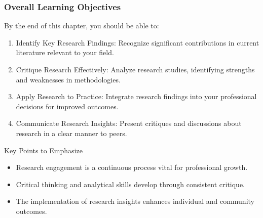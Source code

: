 \documentclass[aspectratio=169]{beamer}
\begin{document}
\begin{frame}[fragile]
    \frametitle{Overall Learning Objectives}
    By the end of this chapter, you should be able to:
    \begin{enumerate}
        \item Identify Key Research Findings: Recognize significant contributions in current literature relevant to your field.
        \item Critique Research Effectively: Analyze research studies, identifying strengths and weaknesses in methodologies.
        \item Apply Research to Practice: Integrate research findings into your professional decisions for improved outcomes.
        \item Communicate Research Insights: Present critiques and discussions about research in a clear manner to peers.
    \end{enumerate}

    \begin{block}{Key Points to Emphasize}
        \begin{itemize}
            \item Research engagement is a continuous process vital for professional growth.
            \item Critical thinking and analytical skills develop through consistent critique.
            \item The implementation of research insights enhances individual and community outcomes.
        \end{itemize}
    \end{block}
\end{frame}
\end{document}
